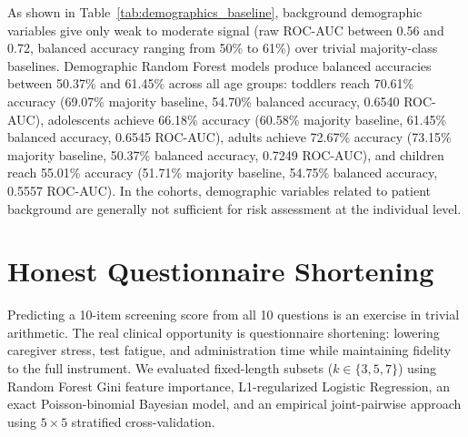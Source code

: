 \documentclass[conference]{IEEEtran}
\begin{document}
As shown in Table~\ref{tab:demographics_baseline}, background demographic variables give only weak to moderate signal (raw ROC-AUC between 0.56 and 0.72, balanced accuracy ranging from 50\% to 61\%) over trivial majority-class baselines. Demographic Random Forest models produce balanced accuracies between 50.37\% and 61.45\% across all age groups: toddlers reach 70.61\% accuracy (69.07\% majority baseline, 54.70\% balanced accuracy, 0.6540 ROC-AUC), adolescents achieve 66.18\% accuracy (60.58\% majority baseline, 61.45\% balanced accuracy, 0.6545 ROC-AUC), adults achieve 72.67\% accuracy (73.15\% majority baseline, 50.37\% balanced accuracy, 0.7249 ROC-AUC), and children reach 55.01\% accuracy (51.71\% majority baseline, 54.75\% balanced accuracy, 0.5557 ROC-AUC). In the cohorts, demographic variables related to patient background are generally not sufficient for risk assessment at the individual level.

\section{Honest Questionnaire Shortening}

Predicting a 10-item screening score from all 10 questions is an exercise in trivial arithmetic. The real clinical opportunity is questionnaire shortening: lowering caregiver stress, test fatigue, and administration time while maintaining fidelity to the full instrument. We evaluated fixed-length subsets ($k \in \{3, 5, 7\}$) using Random Forest Gini feature importance, L1-regularized Logistic Regression, an exact Poisson-binomial Bayesian model, and an empirical joint-pairwise approach using $5 \times 5$ stratified cross-validation.
\end{document}
